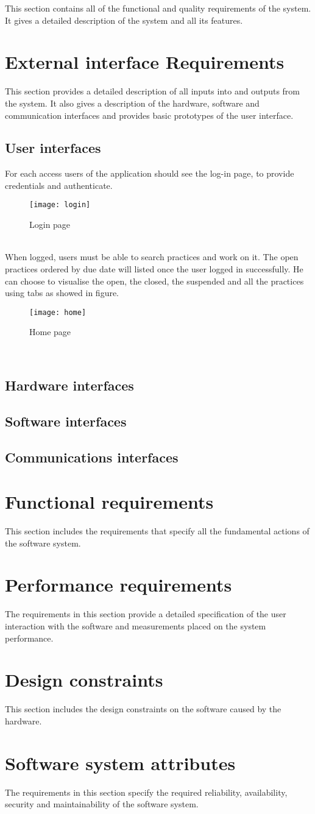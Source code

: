 \documentclass[../main.tex]{subfiles}
\begin{document}
	This section contains all of the functional and quality requirements of the system. It gives a detailed description of the system and all its features.
	\section{External interface Requirements}
		This section provides a detailed description of all inputs into and outputs from the system. It also gives a description of the hardware, software and communication interfaces and provides basic prototypes of the user interface.
	\subsection{User interfaces}
		For each access users of the application should see the log-in page, to provide credentials and authenticate.
		\begin{figure}[h]
			\centering
			\texttt{[image: login]}
			\caption{Login page}
		\end{figure}\\
		When logged, users must be able to search practices and work on it. The open practices ordered by due date will listed once the user logged in successfully. He can choose to visualise the open, the closed, the suspended and all the practices using tabs as showed in figure.
		\begin{figure}[h]
			\centering
			\texttt{[image: home]}
			\caption{Home page}
		\end{figure}\\
	\subsection{Hardware interfaces}
	\subsection{Software interfaces}
	\subsection{Communications interfaces}
	\section{Functional requirements}
		 This section includes the requirements that specify all the fundamental actions of the software system.
	\section{Performance requirements}
		The requirements in this section provide a detailed specification of the user interaction with the software and measurements placed on the system performance.
	\section{Design constraints}
		This section includes the design constraints on the software caused by the hardware.
	\section{Software system attributes}
		The requirements in this section specify the required reliability, availability, security and maintainability of the software system. 
\end{document}
